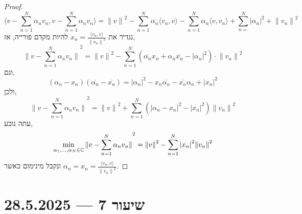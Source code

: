 \begin{proof}
	\[
		\langle v - \sum_{n = 1}^N \alpha_n v_n, v - \sum_{n = 1}^N \alpha_n v_n \rangle
		= {\lVert v \rVert}^2 - \sum_{n = 1}^N \overline{\alpha_n} \langle v_n, v \rangle - \sum_{n = 1}^N \alpha_n \langle v, v_n \rangle + \sum_{n = }^N {| \alpha_n |}^2 + {\lVert v_n \rVert}^2
	\]
	נגדיר את $x_n = \frac{\langle v_n, v \rangle}{{\lVert v_n \rVert}^2}$ להיות מקדם פורייה, אז,
	\[
		{\lVert v - \sum_{n = 1}^N \alpha_n v_n \rVert}^2
		= {\lVert v \rVert}^2 - \sum_{n = 1}^N (\overline{\alpha_n} x_n + \alpha_n \overline{x_n} - {| \alpha_n |}^2) \cdot {\lVert v_n \rVert}^2
	\]
	וגם,
	\[
		(\alpha_n - x_n)(\overline{\alpha_n} - \overline{x_n})
		= {|\alpha_n|}^2 - x_n \overline{\alpha_n} - \overline{x_n} \alpha_n  + {|x_n|}^2
	\]
	ולכן,
	\[
		{\lVert v - \sum_{n = 1}^N \alpha_n v_n \rVert}^2
		= {\lVert v \rVert}^2 + \sum_{n = 1}^N \left( {|\alpha_n - x_n|}^2 - {|x_n|}^2 \right) {\lVert v_n \rVert}^2
	\]
	עתה נובע,
	\[
		\min_{\alpha_1, \ldots, \alpha_N \in \mathbb{C}} {\lVert v - \sum_{n = 1}^N \alpha_n v_n \rVert}^2
		= {\lVert v \rVert}^2 - \sum_{n = 1}^N {|x_n|}^2 {\lVert v_n \rVert}^2
	\]
	ונקבל מינימום כאשר $\alpha_n = x_n = \frac{\langle v_n, v \rangle}{{\lVert v_n \rVert}^2}$.
\end{proof}

\section{שיעור 7 --- 28.5.2025}

